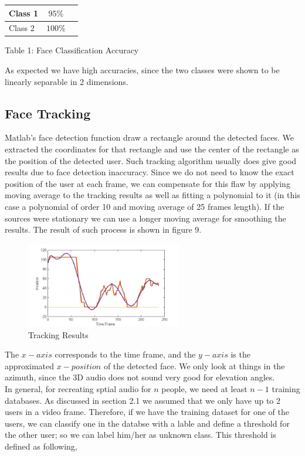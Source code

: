 \documentclass{article}
\begin{document}
\begin{center}
\begin{tabular}{ | l|c | r| }
\hline
Class 1 & $95\%$ \\ \hline
Class 2 & $100\%$ \\ \hline
\end{tabular}
\end{center}\centerline{Table 1: Face Classification Accuracy}

\centerline{}
As expected we have high accuracies, since the two classes were shown to be linearly separable in 2 dimensions. 
\subsection{Face Tracking} 
Matlab's face detection function draw a rectangle around the detected faces. We extracted the coordinates for that rectangle and use the center of the rectangle as the position of the detected user. Such tracking algorithm usually does give good results due to face detection inaccuracy. Since we do not need to know the exact position of the user at each frame, we can compensate for this flaw by applying moving average to the tracking results as well as fitting a polynomial to it (in this case a polynomial of order 10 and moving average of 25 frames length). If the sources were stationary we can use a longer moving average for smoothing the results. The result of such process is shown in figure 9. 
\begin{figure}[htb]
\begin{minipage}[b]{0.88\linewidth}
\centerline{\includegraphics[width=6.8cm]{tracking_results.jpg}}
\end{minipage}
\caption{Tracking Results}
\label{fig:res}
\end{figure}
The $x-axis$ corresponds to the time frame, and the $y-axis$ is the approximated $x-position$ of the detected face. We only look at things in the azimuth, since the 3D audio does not sound very good for elevation angles. \\
In general, for recreating sptial audio for $n$ people, we need at least $n-1$ training databases. As discussed in section 2.1 we assumed that we only have up to 2 users in a video frame. Therefore, if we have the training dataset for one of the users, we can classify one in the databse with a lable and define a threshold for the other user; so we can label him/her as unknown class. This threshold is defined as following, 
\end{document}
